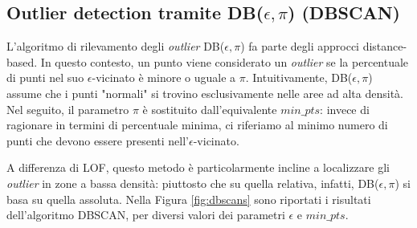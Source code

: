 \documentclass[a4paper]{article}
\begin{document}
\subsection{Outlier detection tramite DB($\epsilon,\pi$) (DBSCAN)}

L'algoritmo di rilevamento degli \textit{outlier} DB($\epsilon,\pi$) fa parte degli approcci distance-based. In questo contesto, un punto viene considerato un \textit{outlier} se la percentuale di punti nel suo $\epsilon$-vicinato è minore o uguale a $\pi$. Intuitivamente, DB($\epsilon,\pi$) assume che i punti "normali" si trovino esclusivamente nelle aree ad alta densità. Nel seguito, il parametro $\pi$ è sostituito dall'equivalente $min\_pts$: invece di ragionare in termini di percentuale minima, ci riferiamo al minimo numero di punti che devono essere presenti nell'$\epsilon$-vicinato.

A differenza di LOF, questo metodo è particolarmente incline a localizzare gli \textit{outlier} in zone a bassa densità: piuttosto che su quella relativa, infatti, DB($\epsilon,\pi$) si basa su quella assoluta. Nella Figura \ref{fig:dbscans} sono riportati i risultati dell'algoritmo DBSCAN, per diversi valori dei parametri $\epsilon$ e $min\_pts$.
\end{document}
